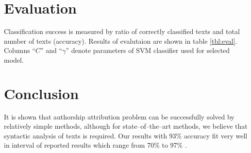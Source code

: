 \documentclass[11pt,english]{article}
\begin{document}
\begin{multicols}{2}
\section{Evaluation}
\label{sec:evaluacija}
Classification success is measured by ratio of correctly classified texts and
total number of texts (accuracy). Results of evalutaion are shown in table
\ref{tbl:eval}. Columns ``$C$'' and ``$\gamma$'' denote parameters of SVM
classifier used for selected model.


% 
% 

\section{Conclusion}
It is shown that authorship attribution problem can be successfully solved by
relatively simple methods, although for state--of--the--art methods, we
believe that syntactic analysis of texts is required. Our results with
93\% accuracy fit very well in interval of reported results which range from
70\% to 97\% \citep{coyotl2006authorship,keselj2003n,luyckx2005shallow,stamatatos2001computer}.


\end{multicols}
\end{document}
